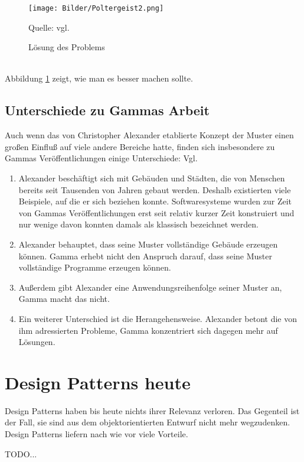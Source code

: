 \documentclass[fontsize=11pt,a4paper,final]{scrreprt}[2003/01/01]
\newcommand*{\quelle}{%
	\footnotesize Quelle: 
}
\begin{document}
\begin{figure}[H]
	\centering
	\texttt{[image: Bilder/Poltergeist2.png]}
	\caption{Lösung des Problems}
	\quelle{vgl. \cite[S. 61]{Brown1998}}
	\label{fig:Poltergeist2}
\end{figure} \ \\
Abbildung \ref{fig:Poltergeist2} zeigt, wie man es besser machen sollte.

\section{Unterschiede zu Gammas Arbeit}
Auch wenn das von Christopher Alexander etablierte Konzept der Muster einen großen Einfluß auf viele andere Bereiche hatte, finden sich insbesondere zu Gammas Veröffentlichungen einige Unterschiede: Vgl. \cite[S. 438 - 439]{gamma2004}

\begin{enumerate} 
\item Alexander beschäftigt sich mit Gebäuden und Städten, die von Menschen bereits seit Tausenden von Jahren gebaut werden. Deshalb existierten viele Beispiele, auf die er sich beziehen konnte. Softwaresysteme wurden zur Zeit von Gammas Veröffentlichungen erst seit relativ kurzer Zeit konstruiert und nur wenige davon konnten damals als klassisch bezeichnet werden.
\item Alexander behauptet, dass seine Muster vollständige Gebäude erzeugen können. Gamma erhebt nicht den Anspruch darauf, dass seine Muster vollständige Programme erzeugen können.
\item Außerdem gibt Alexander eine Anwendungsreihenfolge seiner Muster an, Gamma macht das nicht.
\item Ein weiterer Unterschied ist die Herangehensweise. Alexander betont die von ihm adressierten Probleme, Gamma konzentriert sich dagegen mehr auf Lösungen.
\end{enumerate}

\chapter{Design Patterns heute}\label{se:Design Patterns heute}

Design Patterns haben bis heute nichts ihrer Relevanz verloren. Das Gegenteil ist der Fall, sie sind aus dem objektorientierten Entwurf nicht mehr wegzudenken. Design Patterns liefern nach wie vor viele Vorteile.

TODO...
   
\newpage

\end{document}
